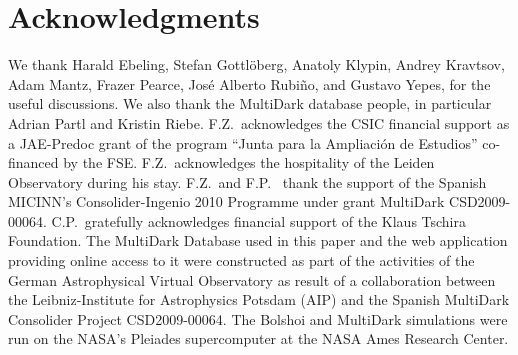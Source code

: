 \documentclass[useAMS,usenatbib]{mn2e}
\begin{document}
\section*{Acknowledgments}
We thank Harald Ebeling, Stefan Gottl{\"o}berg, Anatoly Klypin, Andrey Kravtsov,
Adam Mantz, Frazer Pearce, Jos\'e Alberto Rubi\~no, and Gustavo Yepes, for the
useful discussions. We also thank the MultiDark database people, in particular
Adrian Partl and Kristin Riebe.  F.Z.{\ }acknowledges the CSIC financial support
as a JAE-Predoc grant of the program ``Junta para la Ampliaci\'on de Estudios''
co-financed by the FSE.  F.Z.{\ }acknowledges the hospitality of the Leiden
Observatory during his stay.  F.Z.{\ }and F.P.{\ } thank the support of the
Spanish MICINN's Consolider-Ingenio 2010 Programme under grant MultiDark
CSD2009-00064. C.P.{\ }gratefully acknowledges financial support of the Klaus
Tschira Foundation. The MultiDark Database used in this paper and the web
application providing online access to it were constructed as part of the
activities of the German Astrophysical Virtual Observatory as result of a
collaboration between the Leibniz-Institute for Astrophysics Potsdam (AIP) and
the Spanish MultiDark Consolider Project CSD2009-00064. The Bolshoi and
MultiDark simulations were run on the NASA's Pleiades supercomputer at the NASA
Ames Research Center.






\label{lastpage}
\end{document}
